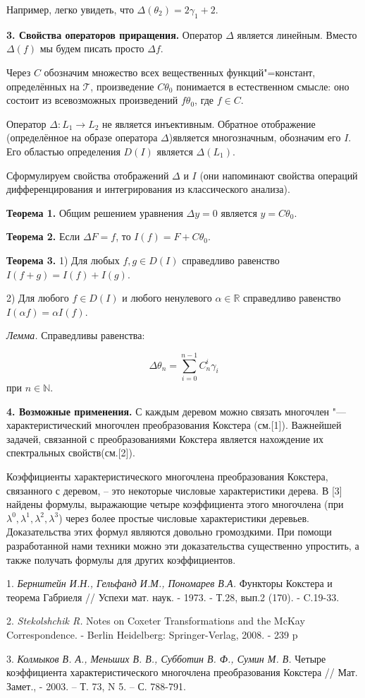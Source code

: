 Например, легко увидеть, что $\Delta (\theta_2) = 2\gamma_1 +2$.


\textbf{3. Свойства операторов приращения.}
Оператор $\Delta$ является линейным. 
Вместо $\Delta(f)$ мы будем писать просто $\Delta f$. 


Через $C$ обозначим множество всех вещественных функций"=констант, определённых на $\mathcal{T}$, произведение $C \theta_0$ понимается в естественном смысле: оно состоит из всевозможных произведений $f\theta_0$,  где $f \in C$.


Оператор $\Delta : L_1 \rightarrow L_2$ не является инъективным. Обратное отображение (определённое на образе оператора $\Delta $)является многозначным, обозначим его $I$.
Его областью определения $D(I)$ является $\Delta (L_1)$.

Сформулируем свойства отображений $\Delta$ и $I$ (они напоминают свойства операций дифференцирования и интегрирования из классического анализа).



\textbf{Теорема 1.} Общим решением  уравнения $\Delta y =0$ является $y = C \theta_0$. 



\textbf{Теорема 2.} Если $\Delta F = f$, то $I (f) = F + C\theta_0$.


\textbf{Теорема 3.}
 1) Для любых $f, g \in D(I)$
справедливо равенство
$I(f+g)=I(f)+I(g)$.


2) Для любого $f\in D(I)$ и любого ненулевого $\alpha \in \mathbb{R}$ справедливо равенство
$I(\alpha f)=\alpha I(f)$.

\textit{Лемма.}
Справедливы равенства: 

$$
\Delta\theta_n= \sum\limits_{i=0}^{n-1} C_n^i \gamma_i
$$
при $n\in \mathbb{N}$.


\textbf{4. Возможные применения.}
С каждым деревом можно связать многочлен "--- характеристический многочлен преобразования Кокстера (см.[1]).
Важнейшей задачей, связанной с преобразованиями Кокстера является нахождение их спектральных свойств(см.[2]).


Коэффициенты характеристического многочлена преобразования Кокстера, связанного с деревом, – это некоторые числовые характеристики дерева.
В [3] найдены формулы, выражающие четыре коэффициента этого многочлена (при $\lambda ^0, \lambda ^1, \lambda ^2, \lambda ^3$) через более простые числовые характеристики деревьев.
Доказательства этих формул являются довольно громоздкими. 
При помощи разработанной нами техники можно эти доказательства существенно упростить, а также получать формулы для других коэффициентов. 



\litlist

1. {\it Бернштейн И.Н., Гельфанд И.М., Пономарев В.А.}
 Функторы Кокстера и
теорема Габриеля // Успехи мат. наук. - 1973. - Т.28, вып.2 (170). - C.19-33.
 
2. {\it Stekolshchik R.}
 Notes on Coxeter Transformations and the McKay Correspondence. -  Berlin Heidelberg: Springer-Verlag, 2008. - 239 p
 
3. {\it Колмыков В. А., Меньших В. В., Субботин В. Ф., Сумин М. В.}
 Четыре коэффициента характеристического многочлена преобразования Кокстера //
Мат. Замет., - 2003. – Т. 73, N 5. – С. 788-791.
